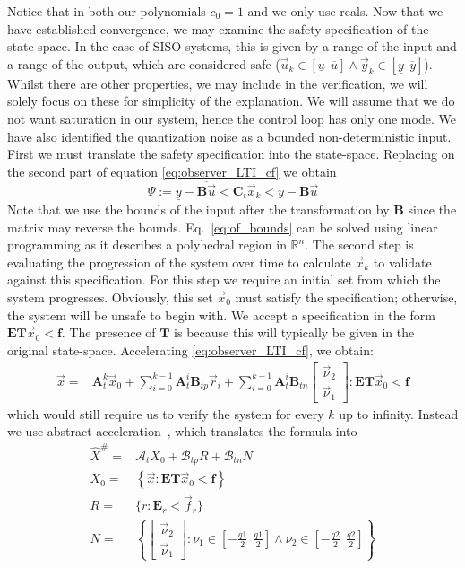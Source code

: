 \documentclass[runningheads,a4paper]{llncs}
\newcommand{\mat}[1]{\boldsymbol{#1}}
\begin{document}
Notice that in both our polynomials $c_0=1$ and we only use reals.
Now that we have established convergence, we may examine the safety 
specification of the state space. In the case of SISO systems, 
this is given by a range of the input and a range of the output, 
which are considered safe ($\vec{u}_k \in [\underline{u}\ \ \overline{u}] \wedge \vec{y}_k \in [\underline{y}\ \ \overline{y}]$). 
Whilst there are other properties, we may include in the verification, 
we will solely focus on these for simplicity of the explanation.
We will assume that we do not want saturation in our system, 
hence the control loop has only one mode. We have also identified 
the quantization noise as a bounded non-deterministic input.
First we must translate the safety specification into the state-space. 
Replacing on the second part of equation \eqref{eq:observer_LTI_cf} we obtain
%
\begin{equation}
\Psi := \underline{y}-\overline{\mat{B}\vec{u}}<\mat{C}_t\vec{x}_k<\overline{y}-\underline{\mat{B}\vec{u}}
\label{eq:of_bounds}
\end{equation}
Note that we use the bounds of the input after the transformation by $\mat{B}$ 
since the matrix may reverse the bounds. Eq.~\eqref{eq:of_bounds} can be solved 
using linear programming as it describes a polyhedral region in $\mathbb{R}^n$.
The second step is evaluating the progression of the system over time to calculate 
$\vec{x}_k$ to validate against this specification. For this step we require 
an initial set from which the system progresses. Obviously, this set $\vec{x}_0$ 
must satisfy the specification; otherwise, the system will be unsafe to begin with.
We accept a specification in the form $\mat{E}\mat{T}\vec{x}_0<\mat{f}$. 
The presence of $\mat{T}$ is because this will typically be given in the original 
state-space. Accelerating \eqref{eq:observer_LTI_cf}, we obtain:
%
\begin{align}
\label{eq:acc_observer_LTI_cf}
\vec{x}=&\mat{A}_t^k\vec{x}_0
+\sum_{i=0}^{k-1} \mat{A}_t^i \mat{B}_{tp} \vec{r}_i
+\sum_{i=0}^{k-1} \mat{A}_t^i \mat{B}_{tn}\left [\begin{array}{c}\vec{\nu}_2\\ \vec{\nu}_1\end{array}\right] : \mat{E}\mat{T} \vec{x}_0<\mat{f}
\end{align}
which would still require us to verify the system for every $k$ up to infinity. 
Instead we use abstract acceleration~\cite{cattaruzza2015unbounded}, which translates the formula into
%
\begin{align}
\label{eq:aa_observer_LTI_cf}
\hat{X}^\#
=&\mathcal{A}_t X_0+\mathcal{B}_{tp} R + \mathcal{B}_{tn} N\\
X_0 =&\left \{\vec{x} : \mat{E}\mat{T} \vec{x}_0<\mat{f} \right\}\nonumber\\
 R =&\{r : \mat{E}_r < \vec{f}_r \}\nonumber\\
 N=&\left \{ \left[\begin{array}{c}\vec{\nu}_2\\ \vec{\nu}_1\end{array}\right] : \nu_1 \in \left[-\frac{q1}{2}\ \ \frac{q1}{2}\right] \wedge \nu_2 \in \left[-\frac{q2}{2}\ \ \frac{q2}{2}\right]  \right \}\nonumber
\end{align}
\end{document}
